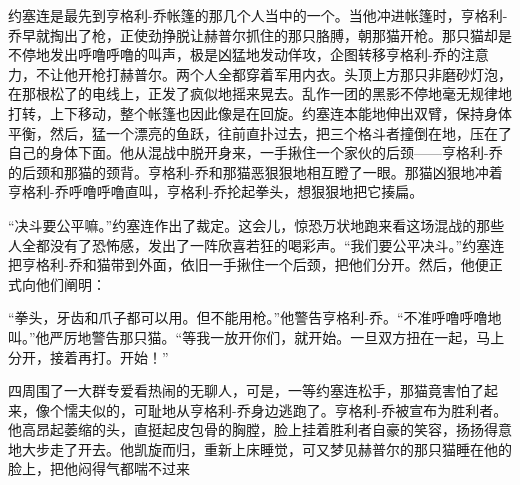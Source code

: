     约塞连是最先到亨格利-乔帐篷的那几个人当中的一个。当他冲进帐篷时，亨格利-乔早就掏出了枪，正使劲挣脱让赫普尔抓住的那只胳膊，朝那猫开枪。那只猫却是不停地发出呼噜呼噜的叫声，极是凶猛地发动佯攻，企图转移亨格利-乔的注意力，不让他开枪打赫普尔。两个人全都穿着军用内衣。头顶上方那只非磨砂灯泡，在那根松了的电线上，正发了疯似地摇来晃去。乱作一团的黑影不停地毫无规律地打转，上下移动，整个帐篷也因此像是在回旋。约塞连本能地伸出双臂，保持身体平衡，然后，猛一个漂亮的鱼跃，往前直扑过去，把三个格斗者撞倒在地，压在了自己的身体下面。他从混战中脱开身来，一手揪住一个家伙的后颈——亨格利-乔的后颈和那猫的颈背。亨格利-乔和那猫恶狠狠地相互瞪了一眼。那猫凶狠地冲着亨格利-乔呼噜呼噜直叫，亨格利-乔抡起拳头，想狠狠地把它揍扁。

    “决斗要公平嘛。”约塞连作出了裁定。这会儿，惊恐万状地跑来看这场混战的那些人全都没有了恐怖感，发出了一阵欣喜若狂的喝彩声。“我们要公平决斗。”约塞连把亨格利-乔和猫带到外面，依旧一手揪住一个后颈，把他们分开。然后，他便正式向他们阐明：

    “拳头，牙齿和爪子都可以用。但不能用枪。”他警告亨格利-乔。“不准呼噜呼噜地叫。”他严厉地警告那只猫。“等我一放开你们，就开始。一旦双方扭在一起，马上分开，接着再打。开始！”

    四周围了一大群专爱看热闹的无聊人，可是，一等约塞连松手，那猫竟害怕了起来，像个懦夫似的，可耻地从亨格利-乔身边逃跑了。亨格利-乔被宣布为胜利者。他高昂起萎缩的头，直挺起皮包骨的胸膛，脸上挂着胜利者自豪的笑容，扬扬得意地大步走了开去。他凯旋而归，重新上床睡觉，可又梦见赫普尔的那只猫睡在他的脸上，把他闷得气都喘不过来

